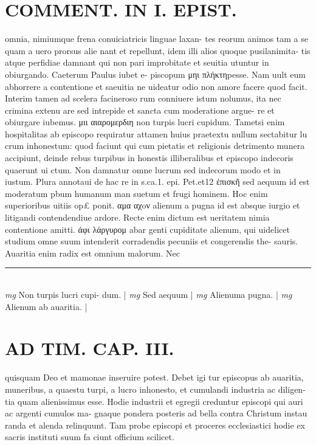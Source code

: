 \documentclass{article}
\begin{document}
\begin{pages}
\section*{COMMENT. IN I. EPIST. }\pstart omnia, nimiumque frena conuiciatricis linguae laxan- tes reorum animos tam a se quam a uero prorsus alie nant et repellunt, idem illi alios quoque pusilanimita- tis atque perfidiae damnant qui non pari improbitate et seuitia utuntur in obiurgando. Caeterum Paulus iubet e- piscopum μηι πλήκτηpesse. Nam uult eum abhorrere a contentione et saeuitia ne uideatur odio non amore facere quod facit. Interim tamen ad scelera facineroso rum conniuere istum nolumus, ita nec crimina extenu are sed intrepide et sancta cum moderatione argue- re et obiurgare iubemus. μιι αιαρομερδιη non turpis lucri cupidum. Tametsi enim hospitalitas ab episcopo requiratur attamen huius praetextu nullum sectabitur lu crum inhonestum: quod faciunt qui cum pietatis et religionis detrimento munera accipiunt, deinde rebus turpibus in honestis illiberalibus et episcopo indecoris quaerunt ui ctum. Non damnatur omne lucrum sed indecorum modo et in iustum. Plura annotaui de hac re in s.ca.1. epi. Pet.et12 ἐπισκῆ sed aequum id est moderatum pbum humanum man suetum et frugi hominem. Hoc enim superioribus uitiis op£ ponit. αμα αχoν alienum a pugna id est absque iurgio et litigandi contendendiue ardore. Recte enim dictum est ueritatem nimia contentione amitti. ἀφι λάργυρομ abar genti cupiditate alienum, qui uidelicet studium omne suum intenderit corradendis pecuniis et congerendis the- sauris. Auaritia enim radix est omnium malorum. Nec  \pend
\vspace{0.5cm}\noindent
\vspace{0.2cm}\rule{1cm}{0.2pt}\\ 
\hspace{0.2cm}\textit{mg}
\footnotesize Non turpis lucri cupi- dum. 
\normalsize| 
\hspace{0.2cm}\textit{mg}
\footnotesize Sed aequum 
\normalsize| 
\hspace{0.2cm}\textit{mg}
\footnotesize Alienuma pugna. 
\normalsize| 
\hspace{0.2cm}\textit{mg}
\footnotesize Alienum ab auaritia. 
\normalsize| 
\section*{AD TIM. CAP. III. }
\marginpar{[ p.128 ]}\pstart quisquam Deo et mamonae inseruire potest. Debet igi tur episcopus ab auaritia, muneribus, a quaestu turpi, a lucro inhonesto, et cumulandi industria ac diligen- tia quam alienissimus esse. Hodie industrii et egregii creduntur episcopi qui auri ac argenti cumulos ma- gnaque pondera posteris ad bella contra Christum instau randa et alenda relinquunt. Tam probe episcopi et proceres ecclesiastici hodie ex sacris instituti suum fa ciunt officium scilicet.  \pend
{}
{}

\end{pages}
\end{document}
